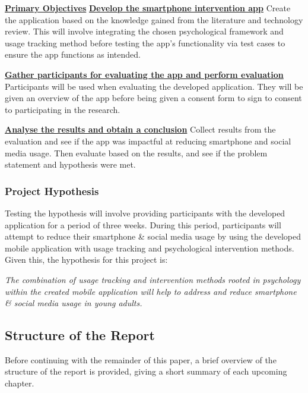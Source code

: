 \documentclass[12pt]{article}
\begin{document}
\noindent\underline{\textbf{Primary Objectives}}\newline\newline
\noindent\underline{\textbf{Develop the smartphone intervention app}}\newline
Create the application based on the knowledge gained from the literature and technology review. This will involve
integrating the chosen psychological framework and usage tracking method before testing the app's functionality
via test cases to ensure the app functions as intended.  \newline

\noindent\underline{\textbf{Gather participants for evaluating the app and perform evaluation}}\newline
Participants will be used when evaluating the developed application. They will be given an overview of the app 
before being given a consent form to sign to consent to participating in the research. \newline

\noindent\underline{\textbf{Analyse the results and obtain a conclusion}}\newline
Collect results from the evaluation and see if the app was impactful at reducing smartphone and social media usage. 
Then evaluate based on the results, and see if the problem statement and hypothesis were met.\newline 


\subsubsection{Project Hypothesis}
Testing the hypothesis will involve providing participants with the developed application for a period of three weeks. %
During this period, participants will attempt to reduce their smartphone \& social media usage by using the developed mobile 
application with usage tracking and psychological intervention methods. Given this, the hypothesis for 
this project is: \newline

\noindent\textit{The combination of usage tracking and intervention methods rooted in psychology within the created mobile 
application will help to address and reduce smartphone \& social media usage in young adults.}
\newpage

\subsection{Structure of the Report}
Before continuing with the remainder of this paper, a brief overview of the structure of the report is provided, giving
a short summary of each upcoming chapter.
\end{document}

